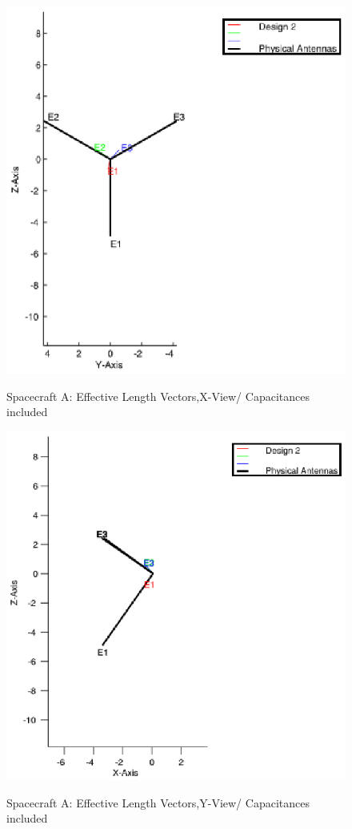 \documentclass[a4paper,14pt]{extbook}
\begin{document}
\begin{figure}
  \begin{center}
    \includegraphics[width=12cm]{HeffD2HGA0-500kHz-XViewCap.eps}\\
    \caption{Spacecraft A: Effective Length Vectors,X-View/ Capacitances included}\label{fig_Heff_D2_A_X_ViewCap}
  \end{center}
\end{figure}


\begin{figure}
 \begin{center}
 \includegraphics[width=12cm]{HeffD2HGA0-500kHz-YViewCap.eps}\\
    \caption{Spacecraft A: Effective Length Vectors,Y-View/ Capacitances included}\label{fig_Heff_D2_A_Y_ViewCap}\end{center}
\end{figure}
\end{document}
